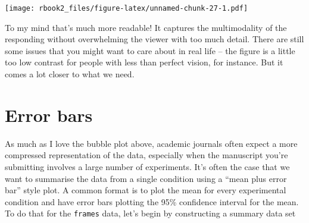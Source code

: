 \documentclass[]{book}
\newenvironment{Shaded}{\begin{snugshade}}{\end{snugshade}}
\newcommand{\DataTypeTok}[1]{\textcolor[rgb]{0.13,0.29,0.53}{#1}}
\newcommand{\DecValTok}[1]{\textcolor[rgb]{0.00,0.00,0.81}{#1}}
\newcommand{\KeywordTok}[1]{\textcolor[rgb]{0.13,0.29,0.53}{\textbf{#1}}}
\newcommand{\NormalTok}[1]{#1}
\newcommand{\OperatorTok}[1]{\textcolor[rgb]{0.81,0.36,0.00}{\textbf{#1}}}
\newcommand{\StringTok}[1]{\textcolor[rgb]{0.31,0.60,0.02}{#1}}
\begin{document}
\begin{Shaded}
\end{Shaded}

\texttt{[image: rbook2\_files/figure-latex/unnamed-chunk-27-1.pdf]}

To my mind that's much more readable! It captures the multimodality of the responding without overwhelming the viewer with too much detail. There are still some issues that you might want to care about in real life -- the figure is a little too low contrast for people with less than perfect vision, for instance. But it comes a lot closer to what we need.

\hypertarget{error-bars}{%
\section{Error bars}\label{error-bars}}

As much as I love the bubble plot above, academic journals often expect a more compressed representation of the data, especially when the manuscript you're submitting involves a large number of experiments. It's often the case that we want to summarise the data from a single condition using a ``mean plus error bar'' style plot. A common format is to plot the mean for every experimental condition and have error bars plotting the 95\% confidence interval for the mean. To do that for the \texttt{frames} data, let's begin by constructing a summary data set

\begin{Shaded}
\end{Shaded}
\end{document}
